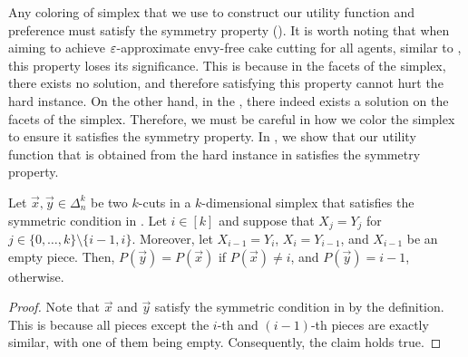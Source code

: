 Any coloring of simplex that we use to construct our utility function and preference must satisfy the symmetry property (). It is worth noting that when aiming to achieve $\varepsilon$-approximate envy-free cake cutting for all agents, similar to \cite{DBLP:journals/ior/DengQS12}, this property loses its significance. This is because in the facets of the simplex, there exists no solution, and therefore satisfying this property cannot hurt the hard instance. On the other hand, in the \mccs, there indeed exists a solution on the facets of the simplex. 
Therefore, we must be careful in how we color the simplex to ensure it satisfies the symmetry property. In , we show that our utility function that is obtained from the hard instance in  satisfies the symmetry property.


\begin{claim}\label{clm:swapping-empty-peice}
    Let $\vec{x}, \vec{y} \in \Delta^k_n$ be two $k$-cuts in a $k$-dimensional simplex that satisfies the symmetric condition in . Let $i \in [k]$ and suppose that $X_j = Y_j$ for $j \in \{0, \ldots, k\} \setminus \{i-1, i\}$. Moreover, let $X_{i-1} = Y_i$, $X_i = Y_{i-1}$, and $X_{i-1}$ be an empty piece. Then, $P(\vec{y}) = P(\vec{x})$ if $P(\vec{x}) \neq i$, and $P(\vec{y})=i-1$, otherwise.
\end{claim}
\begin{proof}
    Note that $\vec{x}$ and $\vec{y}$ satisfy the symmetric condition in  by the definition. This is because all pieces except the $i$-th and $(i-1)$-th pieces are exactly similar, with one of them being empty. Consequently, the claim holds true.
\end{proof}


